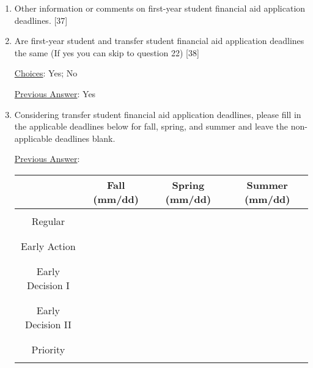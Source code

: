 \documentclass[12 pt, a4paper]{article}
\begin{document}
\begin{Form}
\begin{enumerate}
\item Other information or comments on first-year student financial aid application deadlines. [37] \medskip

\TextField[width = 6 in,multiline, name=90085]{} \medskip

\item Are first-year student and transfer student financial aid application deadlines the same (If yes you can skip to question 22) [38] \medskip

\underline{Choices}: Yes; No \medskip

\underline{Previous Answer}: Yes\medskip

\TextField[width = 6 in,multiline, name=90086]{} \medskip


\item Considering transfer student financial aid application deadlines, please fill in the applicable deadlines below for fall, spring, and summer and leave the non-applicable deadlines blank.


\underline{Previous Answer}:

\begin{tabular}{|c|c|c|c|}
\hline
 & Fall (mm/dd) & Spring (mm/dd) & Summer (mm/dd)\\
 \hline
 &&&\\
Regular &  & &\\
&&&\\
\hline
&&&\\
Early Action &  & &\\
&&&\\
\hline
&&&\\
Early Decision I &  && \\
&&&\\
\hline
&&&\\
Early Decision II & &&\\
&&&\\
\hline
&&&\\
Priority &  &&\\
&&&\\
\hline
\end{tabular}




\end{enumerate}
\end{Form}
\end{document}
